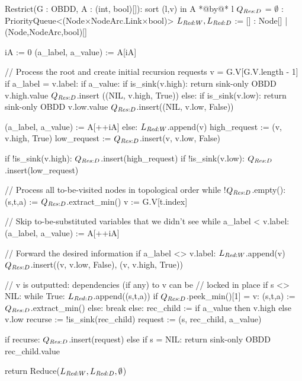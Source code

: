 \begin{blstlisting}
  Restrict(G : OBDD, A : (int, bool)[]):
      sort (l,v) in A *@by@* l
      $\RestrictQrec$ = $\emptyset$ : PriorityQueue<(Node$\times$NodeArc.Link$\times$bool)>
      $\ReduceLwork, \ReduceLdep$ := [] : Node[] | (Node,NodeArc,bool)[]

      iA := 0
      (a_label, a_value) := A[iA]

      // Process the root and create initial recursion requests
      v = G.V[G.V.length - 1]
      if a_label = v.label:
          if a_value:
              if is_sink(v.high): return sink-only OBDD v.high.value
              $\RestrictQrec$.insert ((NIL, v.high, True))
          else:
              if is_sink(v.low): return sink-only OBDD v.low.value
              $\RestrictQrec$.insert((NIL, v.low, False))

          (a_label, a_value) := A[++iA]
      else:
          $\ReduceLwork$.append(v)
          high_request := (v, v.high, True)
          low_request := $\RestrictQrec$.insert(v, v.low, False)

          if !is_sink(v.high): $\RestrictQrec$.insert(high_request)
          if !is_sink(v.low):  $\RestrictQrec$.insert(low_request)

      // Process all to-be-visited nodes in topological order
      while !$\RestrictQrec$.empty():
          (s,t,a) := $\RestrictQrec$.extract_min()
          v := G.V[t.index]

          // Skip to-be-substituted variables that we didn't see
          while a_label < v.label: (a_label, a_value) := A[++iA]

          // Forward the desired information
          if a_label <> v.label:
              $\ReduceLwork$.append(v)
              $\RestrictQrec$.insert((v, v.low, False), (v, v.high, True))

              // v is outputted: dependencies (if any) to v can be
              // locked in place
              if s <> NIL:
                  while True:
                      $\ReduceLdep$.append((s,t,a))
                      if $\RestrictQrec$.peek_min()[1] = v:
                          (s,t,a) := $\RestrictQrec$.extract_min()
                      else: break
          else:
              rec_child := if a_value then v.high else v.low
              recurse := !is_sink(rec_child)
              request := (s, rec_child, a_value)

              if recurse: $\RestrictQrec$.insert(request)
              else if s = NIL: return sink-only OBDD rec_child.value

      return Reduce($\ReduceLwork, \ReduceLdep, \emptyset$)
\end{blstlisting}
